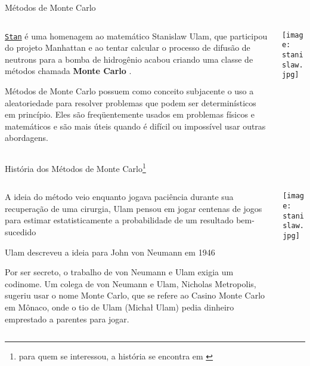 \begin{frame}{Métodos de Monte Carlo}
  \begin{columns}
    \begin{column}{0.8\textwidth}
      \begin{vfilleditems}
        \item \href{http://mc-stan.org/}{\texttt{Stan}} é uma homenagem ao matemático
        Stanislaw Ulam, que participou do projeto Manhattan e ao tentar calcular o
        processo de difusão de neutrons para a bomba de hidrogênio acabou criando uma
        classe de métodos chamada \textbf{Monte Carlo} \parencite{eckhardtStanUlamJohn1987}.
        \item Métodos de Monte Carlo possuem como conceito subjacente o uso a aleatoriedade
        para resolver problemas que podem ser determinísticos em princípio.
        Eles são freqüentemente usados em problemas físicos e matemáticos e
        são mais úteis quando é difícil ou impossível usar outras abordagens.
      \end{vfilleditems}
    \end{column}
    \begin{column}{0.2\textwidth}
      \centering
      \texttt{[image: stanislaw.jpg]}
    \end{column}
  \end{columns}
\end{frame}

\begin{frame}{História dos Métodos de Monte Carlo\footnote{para quem se interessou, a história se encontra em \textcite{eckhardtStanUlamJohn1987}}}
  \begin{columns}
    \begin{column}{0.8\textwidth}
      \begin{vfilleditems}
        \item A ideia do método veio enquanto jogava paciência durante sua
        recuperação de uma cirurgia, Ulam pensou em jogar centenas de jogos para
        estimar estatisticamente a probabilidade de um resultado bem-sucedido
        \item Ulam descreveu a ideia para John von Neumann em 1946
        \item \small Por ser secreto, o trabalho de von Neumann e Ulam exigia um codinome.
        Um colega de von Neumann e Ulam, Nicholas Metropolis, sugeriu usar o nome Monte Carlo,
        que se refere ao Casino Monte Carlo em Mônaco, onde o tio de Ulam (Michał Ulam)
        pedia dinheiro emprestado a parentes para jogar.
      \end{vfilleditems}
    \end{column}
    \begin{column}{0.2\textwidth}
      \centering
      \texttt{[image: stanislaw.jpg]}
    \end{column}
  \end{columns}
\end{frame}

